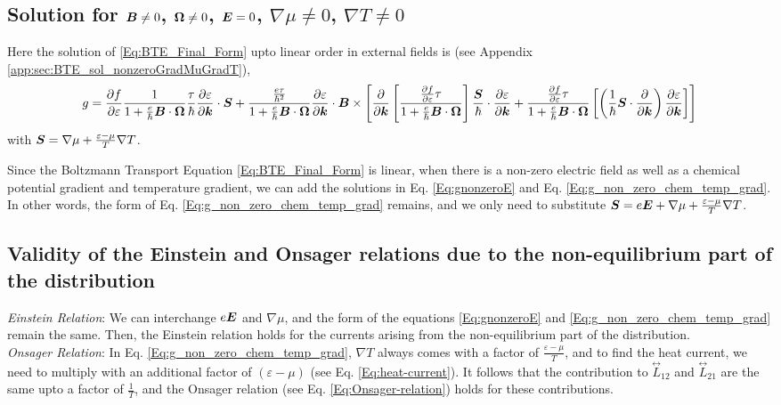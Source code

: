 \documentclass{report}
\renewcommand\vec[1]{\ensuremath\boldsymbol{#1}} %
\begin{document}
\subsection{Solution for $\vec{B}\neq0$, $\vec{\Omega}\neq 0$, $\vec{E} = 0$, $\nabla \mu \neq 0$, $\nabla T \neq 0$}

Here the solution of \eqref{Eq:BTE_Final_Form} upto linear order in external fields is (see Appendix \ref{app:sec:BTE_sol_nonzeroGradMuGradT}),
\begin{equation}\label{Eq:g_non_zero_chem_temp_grad}
	g = \frac{\partial f} {\partial \varepsilon}\frac{1}{1 + \frac{e}{\hbar} \vec{B}\cdot\vec{\Omega}}
	\frac{\tau}{\hbar} \frac{\partial \varepsilon}{\partial \vec{k}}\cdot  \vec{S} + \frac{\frac{e \tau}{\hbar^2} }{1 + \frac{e}{\hbar} \vec{B}\cdot\vec{\Omega}} \frac{\partial \varepsilon}{\partial \vec{k}} \cdot \vec{B} \times \left[ \frac{\partial}{\partial \vec{k}} \left[ \frac{\frac{\partial f} {\partial \varepsilon} \tau}{1 + \frac{e}{\hbar} \vec{B}\cdot\vec{\Omega}}
	\right] \frac{\vec{S}}{\hbar} \cdot \frac{\partial \varepsilon}{\partial \vec{k}} + \frac{\frac{\partial f} {\partial \varepsilon} \tau}{1 + \frac{e}{\hbar} \vec{B}\cdot\vec{\Omega}} \left[\left(\frac{1}{\hbar} \vec{S}\cdot \frac{\partial }{\partial \vec{k}} \right)\frac{\partial \varepsilon}{\partial \vec{k}} \right] \right]
\end{equation}
with $\vec{S} = \nabla \mu + \frac{\varepsilon - \mu}{T} \nabla T$.

Since the Boltzmann Transport Equation \eqref{Eq:BTE_Final_Form} is linear, when there is a non-zero electric field as well as a chemical potential gradient and temperature gradient, we can add the solutions in Eq. \eqref{Eq:gnonzeroE} and Eq. \eqref{Eq:g_non_zero_chem_temp_grad}. In other words, the form of Eq. \eqref{Eq:g_non_zero_chem_temp_grad} remains, and we only need to substitute $\vec{S} = e \vec{E} + \nabla \mu + \frac{\varepsilon - \mu}{T} \nabla T$.

\subsection{Validity of the Einstein and Onsager relations due to the non-equilibrium part of the distribution}\label{sec:non-eq-Einstein-Onsager}
\textit{Einstein Relation}: We can interchange $e\vec{E}$ and $\nabla \mu$, and the form of the equations \eqref{Eq:gnonzeroE} and \eqref{Eq:g_non_zero_chem_temp_grad} remain the same. Then, the Einstein relation holds for the currents arising from the non-equilibrium part of the distribution.\\
\textit{Onsager Relation}: In Eq. \eqref{Eq:g_non_zero_chem_temp_grad}, $\nabla T$ always comes with a factor of $\frac{\varepsilon - \mu}{T}$, and to find the heat current, we need to multiply with an additional factor of $({\varepsilon - \mu})$ (see Eq. \eqref{Eq:heat-current}). It follows that the contribution to $\stackrel{\leftrightarrow}{L}_{12}$ and $\stackrel{\leftrightarrow}{L}_{21}$ are the same upto a factor of $\frac{1}{T}$, and the Onsager relation (see Eq. \eqref{Eq:Onsager-relation}) holds for these contributions.
\end{document}

